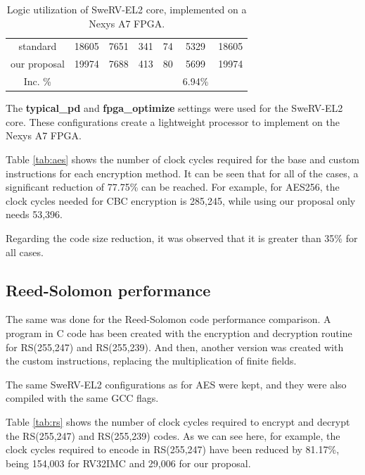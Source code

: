 \begin{table}[tp]
\begin{tabular}{ccccccc}
    \cellcolor[HTML]{EFEFEF}standard     & 18605                & 7651                 & 341                  & 74                   & \cellcolor[HTML]{FFCE93}5329   & 18605                                   \\
    \cellcolor[HTML]{EFEFEF}our proposal  & 19974                & 7688                 & 413                  & 80                   & \cellcolor[HTML]{FFCE93}5699   & 19974                                   \\ \hline
    \cellcolor[HTML]{EFEFEF}Inc. \% &                      &                      &                      &                      & \cellcolor[HTML]{FFCE93}6.94\% &                                           
    \end{tabular}
    \caption{Logic utilization of SweRV-EL2 core, implemented on a Nexys A7 FPGA.}
    \label{tab:area}
\end{table}

The \textbf{typical\_pd} and \textbf{fpga\_optimize} settings were used for the SweRV-EL2 core. These configurations create a lightweight processor to implement on the Nexys A7 FPGA.

Table \ref{tab:aes} shows the number of clock cycles required for the base and custom instructions for each encryption method. It can be seen that for all of the cases, a significant reduction of 77.75\% can be reached. 
For example, for AES256, the clock cycles needed for CBC encryption is 285,245, while using our proposal only needs 53,396.

Regarding the code size reduction, it was observed that it is greater than 35\% for all cases.

\subsection{Reed-Solomon performance} 

The same was done for the Reed-Solomon code performance comparison. A program in C code has been created with the encryption and decryption routine for RS(255,247) and RS(255,239). And then, another 
version was created with the custom instructions, replacing the multiplication of finite fields.

The same SweRV-EL2 configurations as for AES were kept, and they were also compiled with the same GCC flags.

Table \ref{tab:rs} shows the number of clock cycles required to encrypt and decrypt the RS(255,247) and RS(255,239) codes. 
As we can see here, for example, the clock cycles required to encode in RS(255,247) have been reduced by 81.17\%, 
being 154,003 for RV32IMC and 29,006 for our proposal.

